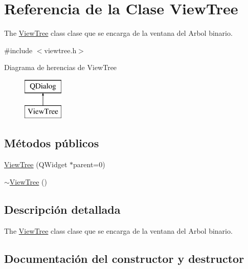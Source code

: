 \hypertarget{class_view_tree}{}\section{Referencia de la Clase View\+Tree}
\label{class_view_tree}


The \mbox{\hyperlink{class_view_tree}{View\+Tree}} class clase que se encarga de la ventana del Arbol binario.  




{\ttfamily \#include $<$viewtree.\+h$>$}

Diagrama de herencias de View\+Tree\begin{figure}[H]
\begin{center}
\leavevmode
\includegraphics[height=2.000000cm]{class_view_tree}
\end{center}
\end{figure}
\subsection*{Métodos públicos}
\begin{DoxyCompactItemize}
\item 
\mbox{\hyperlink{class_view_tree_ab2903b9d0a3b1b9a147a5b1e2206ac0e}{View\+Tree}} (Q\+Widget $\ast$parent=0)
\item 
\mbox{\hyperlink{class_view_tree_a0ad5e737640d9b992b39088dbfe9f291}{$\sim$\+View\+Tree}} ()
\end{DoxyCompactItemize}


\subsection{Descripción detallada}
The \mbox{\hyperlink{class_view_tree}{View\+Tree}} class clase que se encarga de la ventana del Arbol binario. 

\subsection{Documentación del constructor y destructor}
\mbox{\label{class_view_tree_ab2903b9d0a3b1b9a147a5b1e2206ac0e}} 
